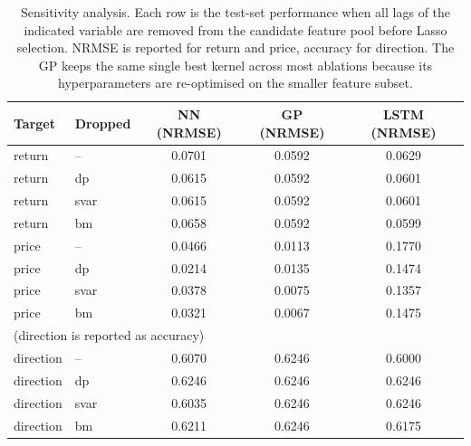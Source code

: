 \documentclass[12pt,a4paper]{article}
\begin{document}
\begin{table}[H]
\centering
\small
\begin{tabular}{llccc}
\toprule
Target & Dropped & NN (NRMSE) & GP (NRMSE) & LSTM (NRMSE) \\
\midrule
return & --   & 0.0701 & 0.0592 & 0.0629 \\
return & dp   & 0.0615 & 0.0592 & 0.0601 \\
return & svar & 0.0615 & 0.0592 & 0.0601 \\
return & bm   & 0.0658 & 0.0592 & 0.0599 \\
\midrule
price  & --   & 0.0466 & 0.0113 & 0.1770 \\
price  & dp   & 0.0214 & 0.0135 & 0.1474 \\
price  & svar & 0.0378 & 0.0075 & 0.1357 \\
price  & bm   & 0.0321 & 0.0067 & 0.1475 \\
\midrule
\multicolumn{5}{l}{(direction is reported as accuracy)} \\
direction & --   & 0.6070 & 0.6246 & 0.6000 \\
direction & dp   & 0.6246 & 0.6246 & 0.6246 \\
direction & svar & 0.6035 & 0.6246 & 0.6246 \\
direction & bm   & 0.6211 & 0.6246 & 0.6175 \\
\bottomrule
\end{tabular}
\caption{Sensitivity analysis. Each row is the test-set performance when all lags of the indicated variable are removed from the candidate feature pool before Lasso selection. NRMSE is reported for return and price, accuracy for direction. The GP keeps the same single best kernel across most ablations because its hyperparameters are re-optimised on the smaller feature subset.}
\label{tab:ex2_sensitivity}
\end{table}
\end{document}
